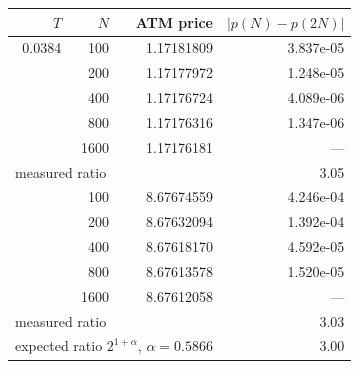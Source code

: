 \begin{tabular}{rrrr}
\toprule
$T$ & $N$ & ATM price & $|p(N)-p(2N)|$\\
\midrule
0.0384 & 100 & 1.17181809 & 3.837e-05\\
 & 200 & 1.17177972 & 1.248e-05\\
 & 400 & 1.17176724 & 4.089e-06\\
 & 800 & 1.17176316 & 1.347e-06\\
 & 1600 & 1.17176181 & ---\\
\multicolumn{3}{l}{measured ratio} & 3.05\\
\addlinespace
1.5918 & 100 & 8.67674559 & 4.246e-04\\
 & 200 & 8.67632094 & 1.392e-04\\
 & 400 & 8.67618170 & 4.592e-05\\
 & 800 & 8.67613578 & 1.520e-05\\
 & 1600 & 8.67612058 & ---\\
\multicolumn{3}{l}{measured ratio} & 3.03\\
\midrule
\multicolumn{3}{l}{expected ratio $2^{1+\alpha}$, $\alpha=0.5866$} & 3.00\\
\bottomrule
\end{tabular}
